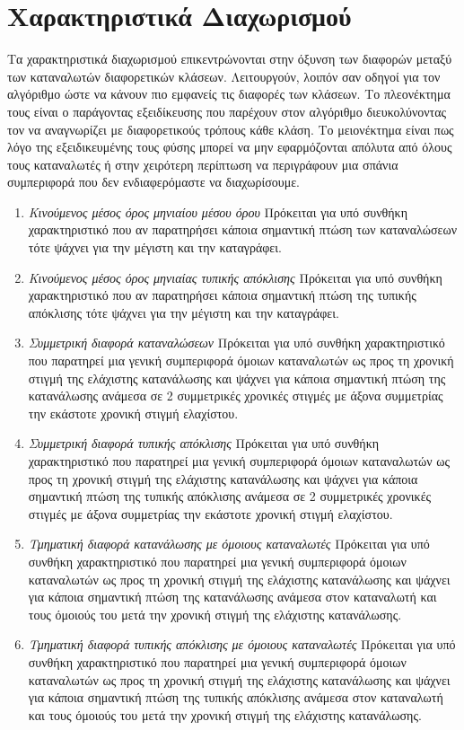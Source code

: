 \documentclass[a4paper, 11pt]{article}
\begin{document}
\section*{Χαρακτηριστικά Διαχωρισμού}
Τα χαρακτηριστικά διαχωρισμού επικεντρώνονται στην όξυνση των διαφορών μεταξύ των καταναλωτών διαφορετικών κλάσεων. Λειτουργούν, λοιπόν σαν οδηγοί για τον αλγόριθμο ώστε να κάνουν πιο εμφανείς τις διαφορές των κλάσεων. Το πλεονέκτημα τους είναι ο παράγοντας εξειδίκευσης που παρέχουν στον αλγόριθμο διευκολύνοντας τον να αναγνωρίζει με διαφορετικούς τρόπους κάθε κλάση. Το μειονέκτημα είναι πως λόγο της εξειδικευμένης τους φύσης μπορεί να μην εφαρμόζονται απόλυτα από όλους τους καταναλωτές ή στην χειρότερη περίπτωση να περιγράφουν μια σπάνια συμπεριφορά που δεν ενδιαφερόμαστε να διαχωρίσουμε.
\begin{enumerate}
\item{\textit{Κινούμενος μέσος όρος μηνιαίου μέσου όρου}} Πρόκειται για υπό συνθήκη χαρακτηριστικό που αν παρατηρήσει κάποια σημαντική πτώση των καταναλώσεων τότε ψάχνει για την μέγιστη και την καταγράφει. 
\item{\textit{Κινούμενος μέσος όρος μηνιαίας τυπικής απόκλισης}} Πρόκειται για υπό συνθήκη χαρακτηριστικό που αν παρατηρήσει κάποια σημαντική πτώση της τυπικής απόκλισης τότε ψάχνει για την μέγιστη και την καταγράφει.
\item{\textit{Συμμετρική διαφορά καταναλώσεων}} Πρόκειται για υπό συνθήκη χαρακτηριστικό που παρατηρεί μια γενική συμπεριφορά όμοιων καταναλωτών ως προς τη χρονική στιγμή της ελάχιστης κατανάλωσης και ψάχνει για κάποια σημαντική πτώση της κατανάλωσης ανάμεσα σε 2 συμμετρικές χρονικές στιγμές με άξονα συμμετρίας την εκάστοτε χρονική στιγμή ελαχίστου.
\item{\textit{Συμμετρική διαφορά τυπικής απόκλισης}} Πρόκειται για υπό συνθήκη χαρακτηριστικό που παρατηρεί μια γενική συμπεριφορά όμοιων καταναλωτών ως προς τη χρονική στιγμή της ελάχιστης κατανάλωσης και ψάχνει για κάποια σημαντική πτώση της τυπικής απόκλισης ανάμεσα σε 2 συμμετρικές χρονικές στιγμές με άξονα συμμετρίας την εκάστοτε χρονική στιγμή ελαχίστου.
\item{\textit{Τμηματική διαφορά κατανάλωσης με όμοιους καταναλωτές}} Πρόκειται για υπό συνθήκη χαρακτηριστικό που παρατηρεί μια γενική συμπεριφορά όμοιων καταναλωτών ως προς τη χρονική στιγμή της ελάχιστης κατανάλωσης και ψάχνει για κάποια σημαντική πτώση της κατανάλωσης ανάμεσα στον καταναλωτή και τους όμοιούς του μετά την χρονική στιγμή της ελάχιστης κατανάλωσης.
\item{\textit{Τμηματική διαφορά τυπικής απόκλισης με όμοιους καταναλωτές}} Πρόκειται για υπό συνθήκη χαρακτηριστικό που παρατηρεί μια γενική συμπεριφορά όμοιων καταναλωτών ως προς τη χρονική στιγμή της ελάχιστης κατανάλωσης και ψάχνει για κάποια σημαντική πτώση της τυπικής απόκλισης ανάμεσα στον καταναλωτή και τους όμοιούς του μετά την χρονική στιγμή της ελάχιστης κατανάλωσης.
\end{enumerate}
\end{document}
